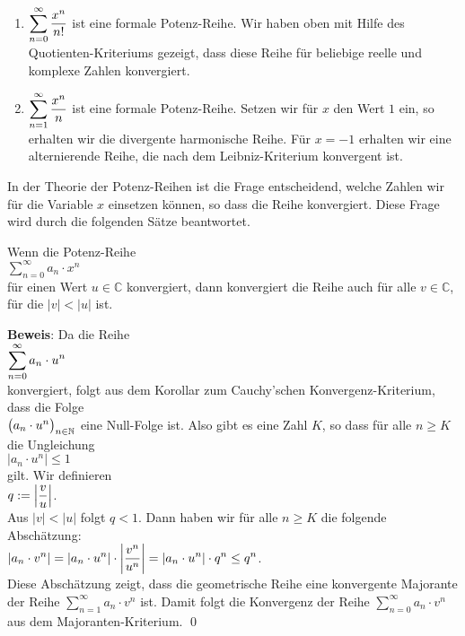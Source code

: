 \examples
\begin{enumerate}
\item $\displaystyle\sum\limits_{n=0}^\infty \frac{x^n}{n!}$ ist eine formale Potenz-Reihe.  
      Wir haben oben mit Hilfe des Quotienten-Kriteriums gezeigt, dass diese Reihe f\"ur
      beliebige reelle und komplexe Zahlen konvergiert.
\item $\displaystyle\sum\limits_{n=1}^\infty \frac{x^n}{n}$ ist eine formale Potenz-Reihe.  
      Setzen wir f\"ur $x$ den Wert $1$ ein, so erhalten wir die divergente harmonische
      Reihe.  F\"ur $x=-1$ erhalten wir eine alternierende Reihe, die nach dem Leibniz-Kriterium
      konvergent ist. \eox
\end{enumerate}

In der Theorie der Potenz-Reihen ist die Frage entscheidend, welche Zahlen wir f\"ur die
Variable $x$ einsetzen k\"onnen, so dass die Reihe konvergiert.  Diese Frage wird durch die
folgenden S\"atze beantwortet.

\begin{Satz}\label{satz:konvergenz-radius}
Wenn die Potenz-Reihe 
\\[0.2cm]
\hspace*{1.3cm}
$\sum\limits_{n=0}^\infty a_n\cdot x^n$ 
\\[0.2cm]
f\"ur einen Wert $u \in \mathbb{C}$ konvergiert, dann konvergiert die Reihe auch f\"ur alle $v
\in \mathbb{C}$, f\"ur die $|v| < |u|$ ist.
\end{Satz}

\noindent 
\textbf{Beweis}:  Da die Reihe
\\[0.2cm]
\hspace*{1.3cm}
 $\displaystyle\sum\limits_{n=0}^\infty a_n\cdot u^n$ 
\\[0.2cm]
konvergiert, folgt aus dem
Korollar zum Cauchy'schen Kon\-vergenz-Kriterium, dass die Folge \\ $\bigl(a_n\cdot u^n\bigr)_{n\in\mathbb{N}}$ eine
Null-Folge ist.  Also gibt es eine Zahl $K$, so dass f\"ur alle $n \geq K$ die Ungleichung 
\\[0.2cm]
\hspace*{1.3cm}      
$\left|a_n\cdot u^n\right| \leq 1$
\\[0.2cm]
gilt.  Wir definieren 
\\[0.2cm]
\hspace*{1.3cm}
$\displaystyle q := \left|\frac{v}{u}\right|$. 
\\[0.2cm]
 Aus $|v| < |u|$ folgt $q < 1$.
Dann haben wir f\"ur alle $n \geq K$ die folgende Absch\"atzung:
      \\[0.2cm]
      \hspace*{1.3cm}      
      $\displaystyle\left|a_n\cdot v^n\right| = 
      \left|a_n\cdot u^n\right| \cdot  \left|\frac{v^n}{u^n}\right| =
      \left|a_n\cdot u^n\right| \cdot  q^n \leq q^n$.
      \\[0.2cm]
Diese Absch\"atzung zeigt, dass die geometrische Reihe eine konvergente Majorante der Reihe
$\sum_{n=1}^\infty a_n\cdot v^n$ ist.  Damit folgt die Konvergenz der Reihe $\sum_{n=0}^\infty a_n\cdot v^n$  aus dem
Majoranten-Kriterium. \qed 

